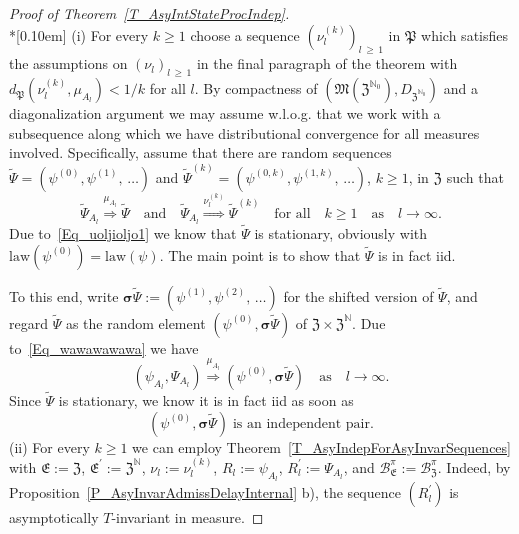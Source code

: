 \documentclass[AHL,Unicode,longabstracts]{cedram}
\newcommand{\clB}{\mathcal{B}}
\newcommand{\law}{\mathrm{law}}
\newcommand{\bfsig}{\boldsymbol{\sigma}}
\newcommand{\frkP}{\mathfrak{P}}
\newcommand{\frkE}{\mathfrak{E}}
\newcommand{\frkZ}{\mathfrak{Z}}
\newcommand{\frkM}{\mathfrak{M}}
\newcommand{\bbN}{\mathbb{N}}
\begin{document}
\begin{proof}[{Proof of Theorem~\ref{T_AsyIntStateProcIndep}}]\ \\*[0.10em]
\noindent (i) For every $k\geq1$ choose a sequence $(\nu_{l}^{(k)})_{l\,\geq\,1}$ in $\frkP$ which satisfies the assumptions on $(\nu_{l})_{l\,\geq\,1}$ in the final paragraph of the theorem with $d_{\frkP}(\nu_{l}^{(k)},\mu_{A_{l}})<1/k$ for all $l$. By compactness of $(\frkM(\frkZ^{\bbN_{0} }),D_{\frkZ^{\bbN_{0}}})$ and a diagonalization argument we may assume w.l.o.g. that we work with a subsequence along which we have distributional convergence for all measures involved. Specifically, assume that there are random sequences $\widetilde{\Psi}=(\psi^{(0)},\psi ^{(1)},\,\ldots)$ and $\widetilde{\Psi}^{(k)}=(\psi^{(0,k)},\psi^{(1,k)},\,\ldots)$, $k\geq1$, in $\frkZ$ such that
\begin{equation}\label{Eq_wawawawawa}
\widetilde{\Psi}_{A_{l}}\overset{\mu_{A_{l}}}{\Longrightarrow}\widetilde{\Psi } \quad\text{and}\quad\widetilde{\Psi}_{A_{l}}\overset{\nu_{l}^{(k)} }{\Longrightarrow}\widetilde{\Psi}^{(k)}\quad\text{for all}\quad k\geq1\quad\text{as}\quad l\rightarrow\infty. 
\end{equation}
Due to~\eqref{Eq_uoljioljo1} we know that $\widetilde{\Psi}$ is stationary, obviously with $\law(\psi^{(0)})=\law(\psi)$. The main point is to show that $\widetilde{\Psi}$ is in fact iid.



To this end, write $\bfsig\widetilde{\Psi}:=(\psi^{(1)},\psi ^{(2)},\,\ldots)$ for the shifted version of $\widetilde{\Psi}$, and regard $\widetilde{\Psi}$ as the random element $(\psi^{(0)},\bfsig\widetilde{\Psi})$ of $\frkZ\times\frkZ^{\bbN}$. Due to~\eqref{Eq_wawawawawa} we have
\begin{equation}
\left(\psi_{A_{l}},\Psi_{A_{l}}\right)\overset{\mu_{A_{l}}}{\Longrightarrow}\left(\psi ^{(0)},\bfsig\widetilde{\Psi}\right)\quad\text{as}\quad l\rightarrow\infty.
\end{equation}
Since $\widetilde{\Psi}$ is stationary, we know it is in fact iid as soon as
\begin{equation}\label{Eq_FirstEntraIndependent}
\left(\psi^{(0)},\bfsig\widetilde{\Psi}\right)\;\text{is an independent pair}.
\end{equation}
(ii) For every $k\geq1$ we can employ Theorem~\ref{T_AsyIndepForAsyInvarSequences} with $\frkE:=\frkZ$, $\frkE^{\prime}:=\frkZ^{\bbN}$, $\nu_{l}:=\nu_{l}^{(k)}$, $R_{l}:=\psi_{A_{l}}$, $R_{l}^{\prime}:=\Psi_{A_{l}}$, and $\clB _{\frkE}^{\pi}:=\clB_{\frkZ}^{\pi}$. Indeed, by Proposition~\ref{P_AsyInvarAdmissDelayInternal} b), the sequence $(R_{l}^{\prime})$ is asymptotically $T$-invariant in measure.


\end{proof}
\end{document}

